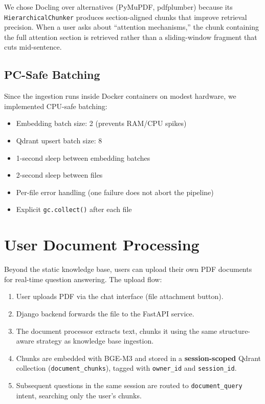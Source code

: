 \documentclass[12pt, a4paper]{article}
\begin{document}
\begin{notebox}
We chose Docling over alternatives (PyMuPDF, pdfplumber) because its
\texttt{HierarchicalChunker} produces section-aligned chunks that
improve retrieval precision. When a user asks about ``attention
mechanisms,'' the chunk containing the full attention section is retrieved
rather than a sliding-window fragment that cuts mid-sentence.
\end{notebox}

\subsection{PC-Safe Batching}

Since the ingestion runs inside Docker containers on modest hardware, we
implemented CPU-safe batching:
\begin{itemize}[leftmargin=2em]
  \item Embedding batch size: 2 (prevents RAM/CPU spikes)
  \item Qdrant upsert batch size: 8
  \item 1-second sleep between embedding batches
  \item 2-second sleep between files
  \item Per-file error handling (one failure does not abort the pipeline)
  \item Explicit \texttt{gc.collect()} after each file
\end{itemize}


\section{User Document Processing}
\label{sec:chunking}

Beyond the static knowledge base, users can upload their own PDF documents
for real-time question answering. The upload flow:

\begin{enumerate}[leftmargin=2em]
  \item User uploads PDF via the chat interface (file attachment button).
  \item Django backend forwards the file to the FastAPI service.
  \item The document processor extracts text, chunks it using the same
        structure-aware strategy as knowledge base ingestion.
  \item Chunks are embedded with BGE-M3 and stored in a
        \textbf{session-scoped} Qdrant collection (\texttt{document\_chunks}),
        tagged with \texttt{owner\_id} and \texttt{session\_id}.
  \item Subsequent questions in the same session are routed to
        \texttt{document\_query} intent, searching only the user's chunks.
\end{enumerate}
\end{document}
